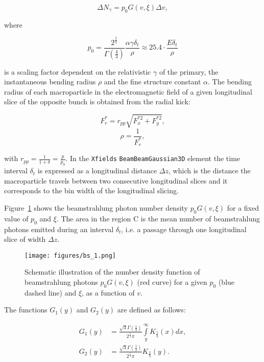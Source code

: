 \begin{equation}
    \Delta N_{\gamma} = p_0G(v, \xi)\Delta v,
	\label{eq:bs_6}
\end{equation}

where

\begin{equation}
p_0 = \frac{2^{\frac{2}{3}}}{\Gamma(\frac{4}{3})} \frac{\alpha\gamma\delta_t}{\rho}\approx 25.4\cdot \frac{E \delta_t}{\rho}
	\label{eq:bs_7}
\end{equation}

is a scaling factor dependent on the relativistic $\gamma$ of the primary, the instantaneous bending radius $\rho$ and the fine structure constant $\alpha$. The bending radius of each macroparticle in the electromagnetic field of a given longitudinal slice of the opposite bunch is obtained from the radial kick:

\begin{equation}
	F_r^*=r_{pp}\sqrt{F_x^{*2} + F_y^{*2}},
	\label{eq:bs_8}
\end{equation}
\begin{equation}
	\rho=\frac{1}{F_r^*},
	\label{eq:bs_9}
\end{equation}

with $r_{pp}=\frac{1}{1 + \delta}=\frac{p}{p_0}$. In the \texttt{Xfields} \texttt{BeamBeamGaussian3D} element the time interval $\delta_t$ is expressed as a longitudinal distance $\Delta z$, which is the distance the macroparticle travels between two consecutive longitudinal slices and it corresponds to the bin width of the longitudinal slicing.

Figure~\ref{fig:bs_1} shows the beamstrahlung photon number density $p_0G(v,\xi)$ for a fixed value of $p_0$ and $\xi$. The area in the region C is the mean number of beamstrahlung photons emitted during an interval $\delta_t$, i.e. a passage through one longitudinal slice of width $\Delta z$.

\begin{figure}[h]
	\centering
	\texttt{[image: figures/bs\_1.png]}
	\caption{\small Schematic illustration of the number density function of beamstrahlung photons $p_0G(v,\xi)$ (red curve) for a given $p_0$ (blue dashed line) and $\xi$, as a function of $v$.  \label{fig:bs_1}}
\end{figure}

The functions $G_1(y)$ and $G_2(y)$ are defined as follows:

\begin{equation}
	\begin{split}
		G_1(y) & = \frac{\sqrt{3}\Gamma(\frac{1}{3})}{2^{\frac{5}{3}}\pi} \int\limits_{y}^{\infty} K_{\frac{5}{3}}(x) dx, \\
		G_2(y) & = \frac{\sqrt{3}\Gamma(\frac{1}{3})}{2^{\frac{5}{3}}\pi}  K_{\frac{2}{3}}(y).
	\end{split}
 	\label{eq:bs_10}
\end{equation}

